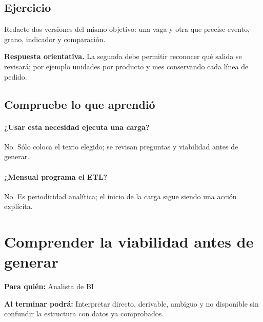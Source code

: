 \subsection{Ejercicio}
Redacte dos versiones del mismo objetivo: una vaga y otra que precise evento, grano, indicador y comparación.

\textbf{Respuesta orientativa.} La segunda debe permitir reconocer qué salida se revisará; por ejemplo unidades por producto y mes conservando cada línea de pedido.

\subsection{Compruebe lo que aprendió}
\paragraph{¿Usar esta necesidad ejecuta una carga?} No. Sólo coloca el texto elegido; se revisan preguntas y viabilidad antes de generar.

\paragraph{¿Mensual programa el ETL?} No. Es periodicidad analítica; el inicio de la carga sigue siendo una acción explícita.


\section{Comprender la viabilidad antes de generar}
\label{unidad:BI03}
\textbf{Para quién:} Analista de BI\par
\textbf{Al terminar podrá:} Interpretar directo, derivable, ambiguo y no disponible sin confundir la estructura con datos ya comprobados.

